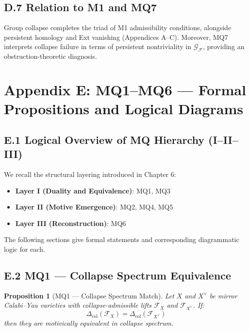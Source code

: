 \documentclass[11pt]{article}
\newtheorem{proposition}[theorem]{Proposition}
\begin{document}
\subsection*{D.7 Relation to M1 and MQ7}

Group collapse completes the triad of M1 admissibility conditions, alongside persistent homology and Ext vanishing (Appendices A–C). Moreover, MQ7 interprets collapse failure in terms of persistent nontriviality in $\mathcal{G}_{\mathcal{F}}$, providing an obstruction-theoretic diagnosis.

\FloatBarrier




\section*{Appendix E: MQ1–MQ6 — Formal Propositions and Logical Diagrams}

\subsection*{E.1 Logical Overview of MQ Hierarchy (I–II–III)}

We recall the structural layering introduced in Chapter 6:

\begin{itemize}
  \item \textbf{Layer I (Duality and Equivalence)}: MQ1, MQ3
  \item \textbf{Layer II (Motive Emergence)}: MQ2, MQ4, MQ5
  \item \textbf{Layer III (Reconstruction)}: MQ6
\end{itemize}

The following sections give formal statements and corresponding diagrammatic logic for each.

\subsection*{E.2 MQ1 — Collapse Spectrum Equivalence}

\begin{proposition}[MQ1 — Collapse Spectrum Match]
Let $X$ and $X^{\vee}$ be mirror Calabi–Yau varieties with collapse-admissible lifts $\mathcal{F}_X$ and $\mathcal{F}_{X^{\vee}}$. If:
\[
\Delta_{\mathrm{col}}(\mathcal{F}_X) = \Delta_{\mathrm{col}}(\mathcal{F}_{X^{\vee}})
\]
then they are motivically equivalent in collapse spectrum.
\end{proposition}
\end{document}
